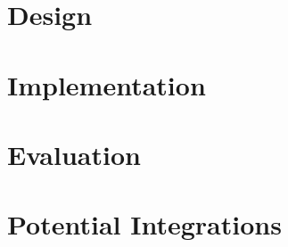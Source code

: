 
% 

% 

\section{Design}\label{sec:opal-design}


\section{Implementation}\label{sec:opal-impl}


\section{Evaluation}\label{sec:opal-evaluation}


\section{Potential Integrations}\label{sec:opal-potential-integrations}


